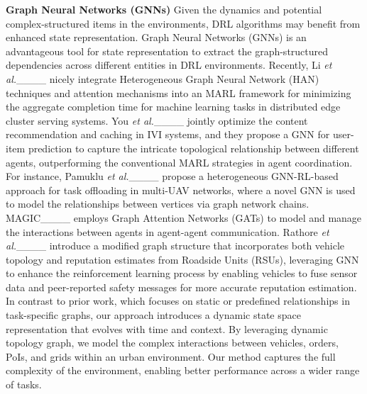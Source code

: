 \smallskip
\noindent\textbf{Graph Neural Networks (GNNs)}
Given the dynamics and potential complex-structured items in the environments, DRL algorithms may benefit from enhanced state representation. Graph Neural Networks (GNNs) is an advantageous tool for state representation to extract the graph-structured dependencies across different entities in DRL environments. Recently, Li \emph{et al.}____ nicely integrate Heterogeneous Graph Neural Network (HAN) techniques and attention mechanisms into an MARL framework for minimizing the aggregate completion time for machine learning tasks in distributed edge cluster serving systems. You \emph{et al.}____ jointly optimize the content recommendation and caching in IVI systems, and they propose a GNN for user-item prediction to capture the intricate topological relationship between different agents, outperforming the conventional MARL strategies in agent coordination. 
For instance, Pamuklu \emph{et al.}____ propose a heterogeneous GNN-RL-based approach for task offloading in multi-UAV networks, where a novel GNN is used to model the relationships between vertices via graph network chains. MAGIC____ employs Graph Attention Networks (GATs) to model and manage the interactions between agents in agent-agent communication. Rathore \emph{et al.}____ introduce a modified graph structure that incorporates both vehicle topology and reputation estimates from Roadside Units (RSUs), leveraging GNN to enhance the reinforcement learning process by enabling vehicles to fuse sensor data and peer-reported safety messages for more accurate reputation estimation.  In contrast to prior work, which focuses on static or predefined relationships in task-specific graphs, our approach introduces a dynamic state space representation that evolves with time and context. By leveraging dynamic topology graph, we model the complex interactions between vehicles, orders, PoIs, and grids within an urban environment. Our method captures the full complexity of the environment, enabling better performance across a wider range of tasks.
